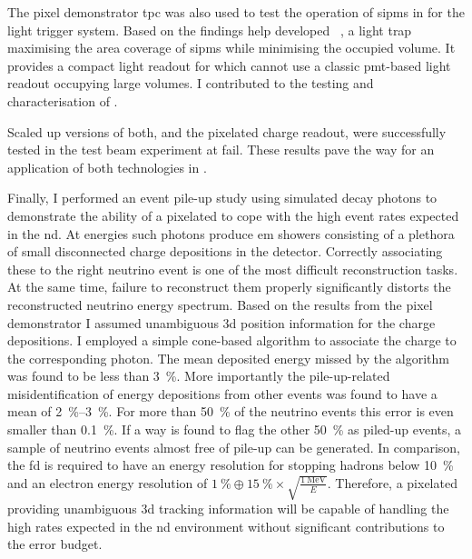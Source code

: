The pixel demonstrator \gls{tpc} was also used to test the operation of \glspl{sipm} in \lar{} for the light trigger system.
Based on the findings \gls{help} developed \AL{}~\cite{arclight}, a light trap maximising the area coverage of \glspl{sipm} while minimising the occupied volume.
It provides a compact light readout for \AC{} which cannot use a classic \gls{pmt}-based light readout occupying large volumes.
I contributed to the testing and characterisation of \AL{}.

Scaled up versions of both, \AL{} and the pixelated charge readout, were successfully tested in the \pixlar{} test beam experiment at \gls{fail}.
These results pave the way for an application of both technologies in \AC{}.

Finally, I performed an event pile-up study using simulated \Pgpz decay photons to demonstrate the ability of a pixelated \lartpc{} to cope with the high event rates expected in the \dune{} \gls{nd}.
At \dune{} energies such photons produce \gls{em} showers consisting of a plethora of small disconnected charge depositions in the detector.
Correctly associating these to the right neutrino event is one of the most difficult reconstruction tasks.
At the same time, failure to reconstruct them properly significantly distorts the reconstructed neutrino energy spectrum.
Based on the results from the pixel demonstrator I assumed unambiguous \gls{3d} position information for the charge depositions.
I employed a simple cone-based algorithm to associate the charge to the corresponding photon.
The mean deposited energy missed by the algorithm was found to be less than \SI{3}{\percent}.
More importantly the pile-up-related misidentification of energy depositions from other events was found to have a mean of \SIrange{2}{3}{\percent}.
For more than \SI{50}{\percent} of the neutrino events this error is even smaller than \SI{0.1}{\percent}.
If a way is found to flag the other \SI{50}{\percent} as piled-up events, a sample of neutrino events almost free of pile-up can be generated.
In comparison, the \gls{fd} is required to have an energy resolution for stopping hadrons below \SI{10}{\percent} and an electron energy resolution of $\SI{1}{\percent} \oplus \SI{15}{\percent} \times \sqrt{\frac{\SI{1}{\mega\electronvolt}}{E}}$.
Therefore, a pixelated \AC{} providing unambiguous \gls{3d} tracking information will be capable of handling the high rates expected in the \dune{} \gls{nd} environment without significant contributions to the error budget.

